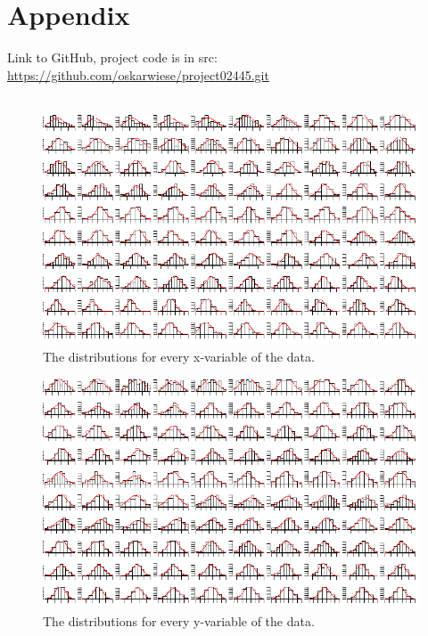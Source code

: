 \documentclass[11pt, fleqn, titlepage]{article}
\begin{document}
\section{Appendix}
Link to GitHub, project code is in src:
\url{https://github.com/oskarwiese/project02445.git} 
\\\\ 

\begin{figure}[H]
	\centering
	\includegraphics[width=0.9\linewidth]{billeder/x_dists}
	\caption{The distributions for every x-variable of the data.}
	\label{fig:xdists}
\end{figure}

\begin{figure}[H]
	\centering
	\includegraphics[width=0.9\linewidth]{billeder/y_dists}
	\caption{The distributions for every y-variable of the data.}
	\label{fig:ydists}
\end{figure}
\end{document}
